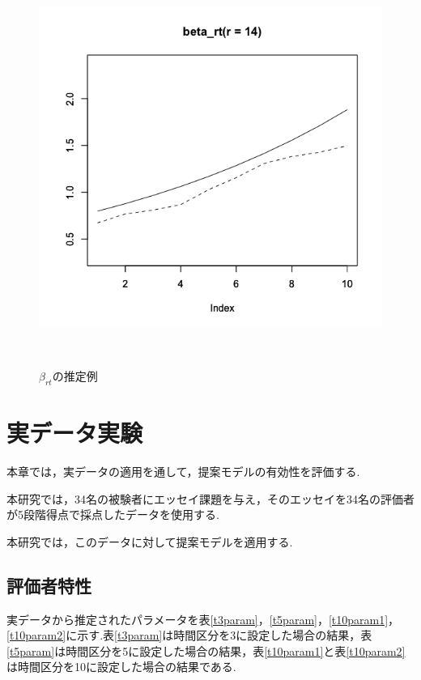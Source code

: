 \documentclass[a4paper,11pt,oneside,openany]{jsbook}
\begin{document}
\begin{figure}[]
\begin{minipage}[b]{0.3\linewidth}
  \label{2}
 \end{minipage}
 \begin{minipage}[b]{0.3\linewidth}
  \centering
  \includegraphics[keepaspectratio,scale=0.25]{img/beta_rt_3.png}
  \label{3}
 \end{minipage}\\
 \caption{$\beta_{rt}$の推定例}\label{beta_rt_recovery}
\end{figure}

\newpage
\chapter{実データ実験}
本章では，実データの適用を通して，提案モデルの有効性を評価する.

本研究では，34名の被験者にエッセイ課題を与え，そのエッセイを34名の評価者が5段階得点で採点したデータを使用する.

本研究では，このデータに対して提案モデルを適用する.
\section{評価者特性}
実データから推定されたパラメータを表\ref{t3param}，\ref{t5param}，\ref{t10param1}，\ref{t10param2}に示す.表\ref{t3param}は時間区分を3に設定した場合の結果，表\ref{t5param}は時間区分を5に設定した場合の結果，表\ref{t10param1}と表\ref{t10param2}は時間区分を10に設定した場合の結果である.
\end{document}
